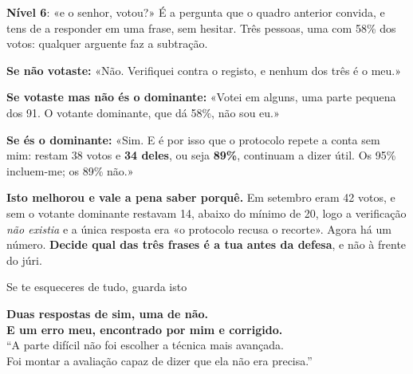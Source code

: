 \documentclass[aspectratio=169]{beamer}
\newcommand{\key}[1]{\textbf{\textcolor{blue!55!black}{#1}}}
\begin{document}
\begin{frame}{\key{Nível 6}: «e o senhor, votou?»}
É a pergunta que o quadro anterior convida, e tens de a responder em uma frase, sem hesitar.
Três pessoas, uma com 58\% dos votos: qualquer arguente faz a subtração.

\medskip
\textbf{Se não votaste:} «Não. Verifiquei contra o registo, e nenhum dos três é o meu.»

\medskip
\textbf{Se votaste mas não és o dominante:} «Votei em alguns, uma parte pequena dos 91. O
votante dominante, que dá 58\%, não sou eu.»

\medskip
\textbf{Se és o dominante:} «Sim. E é por isso que o protocolo repete a conta sem mim: restam
38 votos e \key{34 deles}, ou seja \key{89\%}, continuam a dizer útil. Os 95\% incluem-me; os 89\% não.»

\medskip
\textbf{Isto melhorou e vale a pena saber porquê.} Em setembro eram 42 votos, e sem o votante
dominante restavam 14, abaixo do mínimo de 20, logo a verificação \emph{não existia} e a
única resposta era «o protocolo recusa o recorte». Agora há um número. \textbf{Decide qual das
três frases é a tua antes da defesa}, e não à frente do júri.
\end{frame}

\begin{frame}{Se te esqueceres de tudo, guarda isto}
\begin{center}
\vspace{3mm}
\large
\key{Duas respostas de sim, uma de não.}\\[4mm]
\key{E um erro meu, encontrado por mim e corrigido.}\\[8mm]
\normalsize
``A parte difícil não foi escolher a técnica mais avançada.\\
Foi montar a avaliação capaz de dizer que ela não era precisa.''
\end{center}
\end{frame}
\end{document}
